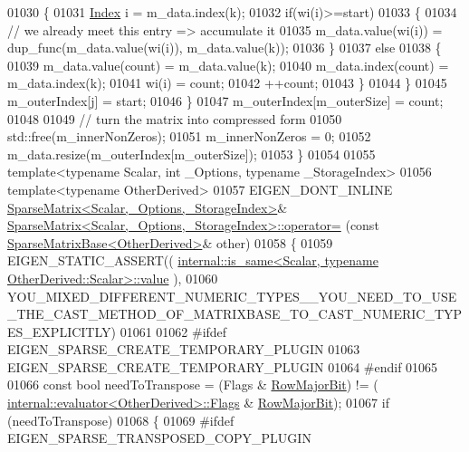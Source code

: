 \begin{DoxyCode}
01030     \{
01031       \hyperlink{group___core___module_a554f30542cc2316add4b1ea0a492ff02}{Index} i = m\_data.index(k);
01032       \textcolor{keywordflow}{if}(wi(i)>=start)
01033       \{
01034         \textcolor{comment}{// we already meet this entry => accumulate it}
01035         m\_data.value(wi(i)) = dup\_func(m\_data.value(wi(i)), m\_data.value(k));
01036       \}
01037       \textcolor{keywordflow}{else}
01038       \{
01039         m\_data.value(count) = m\_data.value(k);
01040         m\_data.index(count) = m\_data.index(k);
01041         wi(i) = count;
01042         ++count;
01043       \}
01044     \}
01045     m\_outerIndex[j] = start;
01046   \}
01047   m\_outerIndex[m\_outerSize] = count;
01048 
01049   \textcolor{comment}{// turn the matrix into compressed form}
01050   std::free(m\_innerNonZeros);
01051   m\_innerNonZeros = 0;
01052   m\_data.resize(m\_outerIndex[m\_outerSize]);
01053 \}
01054 
01055 \textcolor{keyword}{template}<\textcolor{keyword}{typename} Scalar, \textcolor{keywordtype}{int} \_Options, \textcolor{keyword}{typename} \_StorageIndex>
01056 \textcolor{keyword}{template}<\textcolor{keyword}{typename} OtherDerived>
01057 EIGEN\_DONT\_INLINE \hyperlink{group___sparse_core___module_class_eigen_1_1_sparse_matrix}{SparseMatrix<Scalar,\_Options,\_StorageIndex>}& 
      \hyperlink{group___sparse_core___module_class_eigen_1_1_sparse_matrix}{SparseMatrix<Scalar,\_Options,\_StorageIndex>::operator=}
      (\textcolor{keyword}{const} \hyperlink{group___sparse_core___module_class_eigen_1_1_sparse_matrix_base}{SparseMatrixBase<OtherDerived>}& other)
01058 \{
01059   EIGEN\_STATIC\_ASSERT((
      \hyperlink{struct_eigen_1_1internal_1_1is__same}{internal::is\_same<Scalar, typename OtherDerived::Scalar>::value}
      ),
01060         
      YOU\_MIXED\_DIFFERENT\_NUMERIC\_TYPES\_\_YOU\_NEED\_TO\_USE\_THE\_CAST\_METHOD\_OF\_MATRIXBASE\_TO\_CAST\_NUMERIC\_TYPES\_EXPLICITLY)
01061 
01062   \textcolor{preprocessor}{#ifdef EIGEN\_SPARSE\_CREATE\_TEMPORARY\_PLUGIN}
01063     EIGEN\_SPARSE\_CREATE\_TEMPORARY\_PLUGIN
01064 \textcolor{preprocessor}{  #endif}
01065       
01066   \textcolor{keyword}{const} \textcolor{keywordtype}{bool} needToTranspose = (Flags & \hyperlink{group__flags_gae4f56c2a60bbe4bd2e44c5b19cbe8762}{RowMajorBit}) != (
      \hyperlink{struct_eigen_1_1internal_1_1evaluator}{internal::evaluator<OtherDerived>::Flags} & 
      \hyperlink{group__flags_gae4f56c2a60bbe4bd2e44c5b19cbe8762}{RowMajorBit});
01067   \textcolor{keywordflow}{if} (needToTranspose)
01068   \{
01069 \textcolor{preprocessor}{    #ifdef EIGEN\_SPARSE\_TRANSPOSED\_COPY\_PLUGIN}

\end{DoxyCode}
